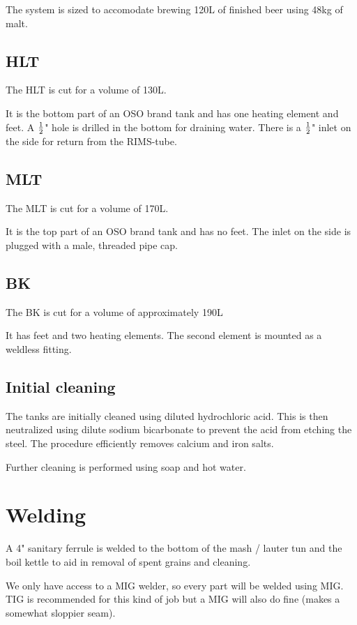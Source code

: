 \documentclass[11pt,fleqn,openany]{book} %
\begin{document}
The system is sized to accomodate brewing 120L of finished beer using 48kg of malt.

\subsection{HLT}

The HLT is cut for a volume of 130L.

It is the bottom part of an OSO brand tank and has one heating element and feet. A $1 \over 2$" hole is drilled in the bottom for draining water.  There is a $1 \over 2$" inlet on the side for return from the RIMS-tube.

\subsection{MLT}

The MLT is cut for a volume of 170L. 

It is the top part of an OSO brand tank and has no feet. The inlet on the side is plugged with a male, threaded pipe cap.

\subsection{BK}

The BK is cut for a volume of approximately 190L

It has feet and two heating elements. The second element is mounted as a weldless fitting.

\subsection{Initial cleaning}

The tanks are initially cleaned using diluted hydrochloric acid. This is then neutralized using dilute sodium bicarbonate to prevent the acid from etching the steel. The procedure efficiently removes calcium and iron salts.

Further cleaning is performed using soap and hot water.

\section{Welding}

A 4" sanitary ferrule is welded to the bottom of the mash / lauter tun and the boil kettle to aid in removal of spent grains and cleaning.

We only have access to a MIG welder, so every part will be welded using MIG. TIG is recommended for this kind of job but a MIG will also do fine (makes a somewhat sloppier seam).\\
\end{document}
